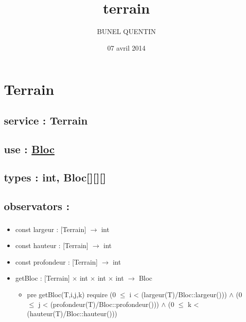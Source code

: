 \documentclass[11pt]{article}
\title{terrain}
\author{BUNEL QUENTIN}
\date{07 avril 2014}
\begin{document}
\maketitle

\setcounter{tocdepth}{3}
\tableofcontents
\vspace*{1cm}
\section{Terrain}
\label{sec-1}

\subsection{service : Terrain}
\label{sec-1.1}

\subsection{use : \href{file:///users/Etu5/3000675/Desktop/spec/bloc.org}{Bloc}}
\label{sec-1.2}

\subsection{types : int, Bloc[][][]}
\label{sec-1.3}



\subsection{observators :}
\label{sec-1.4}

\subsubsection{}

\begin{itemize}

\item const largeur : [Terrain] $\to$ int\\
\label{sec-1.4.1.1}


\item const hauteur : [Terrain] $\to$ int\\
\label{sec-1.4.1.2}


\item const profondeur : [Terrain] $\to$ int\\
\label{sec-1.4.1.3}


\item getBloc : [Terrain] $\times$ int $\times$ int $\times$ int $\to$ Bloc\\
\label{sec-1.4.1.4}

\begin{itemize}

\item pre getBloc(T,i,j,k) require (0 $\leqslant$ i < (largeur(T)/Bloc::largeur())) $\wedge$ (0 $\leqslant$ j < (profondeur(T)/Bloc::profondeur())) $\wedge$ (0 $\leqslant$ k < (hauteur(T)/Bloc::hauteur()))\\
\label{sec-1.4.1.4.1}


\end{itemize} %
\end{itemize} %
\end{document}
